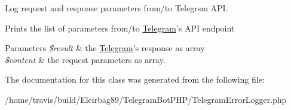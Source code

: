 Log request and response parameters from/to Telegrsm A\-P\-I. 

Prints the list of parameters from/to \hyperlink{class_telegram}{Telegram}'s A\-P\-I endpoint 
\begin{DoxyParams}{Parameters}
{\em \$result} & the \hyperlink{class_telegram}{Telegram}'s response as array \\
\hline
{\em \$content} & the request parameters as array. \\
\hline
\end{DoxyParams}


The documentation for this class was generated from the following file\-:\begin{DoxyCompactItemize}
\item 
/home/travis/build/\-Eleirbag89/\-Telegram\-Bot\-P\-H\-P/Telegram\-Error\-Logger.\-php\end{DoxyCompactItemize}

